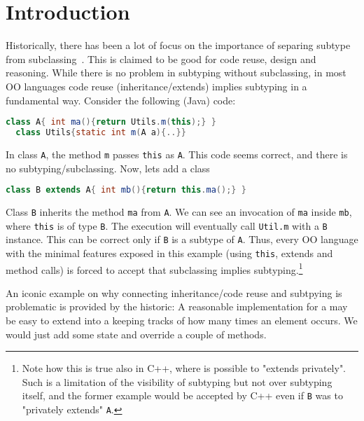 \section{Introduction}

Historically, there has been a lot of focus on the importance of
separing subtype from subclassing~\cite{cook}.  This is claimed to be
good for code reuse, design and reasoning.  While there is no problem
in subtyping without subclassing, in most OO languages code reuse
(inheritance/extends) implies subtyping in a fundamental way. 
Consider the following (Java) code:

\begin{lstlisting}[language=Java]
  class A{ int ma(){return Utils.m(this);} }
  class Utils{static int m(A a){..}}
\end{lstlisting}

In class \lstinline{A}, the method \lstinline{m} passes \lstinline{this} as \lstinline{A}.
This code seems correct, and there is no subtyping/subclassing.
Now, lets add a class \Q@B@

\begin{lstlisting}[language=Java]
  class B extends A{ int mb(){return this.ma();} }
\end{lstlisting}

Class \lstinline{B} inherits the method \lstinline{ma} from
\lstinline{A}.  We can see an invocation of \lstinline{ma} inside
\lstinline{mb}, where \lstinline{this} is of type \lstinline{B}.  The
execution will eventually call \lstinline{Util.m} with a \lstinline{B}
instance. This can be correct only if \lstinline{B} is a subtype of
\lstinline{A}. Thus, every OO language with the minimal features
exposed in this example (using \lstinline{this}, extends and method calls) is forced
to accept that subclassing implies subtyping.\footnote{ Note how this
  is true also in C++, where is possible to "extends privately". Such
  is a limitation of the visibility of subtyping but not over
  subtyping itself, and the former example would be accepted by C++
  even if \lstinline{B} was to "privately extends" \lstinline{A}.}

An iconic example on why connecting inheritance/code reuse and
subtpying is problematic is provided by the
historic\cite{LaLonde:1991:SSS:110673.110679}: A reasonable
implementation for a \Q@Set@ may be easy to extend into a \Q@Bag@
keeping tracks of how many times an element occurs.  We would just add
some state and override a couple of methods.

